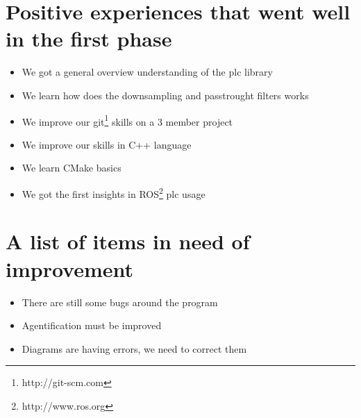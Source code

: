 \documentclass[paper=a4, fontsize=12pt]{scrartcl} %
\numberwithin{equation}{section} %
\numberwithin{figure}{section} %
\numberwithin{table}{section} %
\begin{document}


\section{Positive experiences that went well in the first phase}

\begin{itemize}
  \item We got  a general overview understanding of the plc library
  \item We learn how does the downsampling and passtrought filters works
  \item We improve our git\footnote{http://git-scm.com} skills on a 3 member project
  \item We improve our skills in C++ language
  \item We learn CMake basics
  \item We got the first insights in ROS\footnote{http://www.ros.org} plc usage
\end{itemize}



\section{A list of items in need of improvement}

\begin{itemize}
  \item There are still some bugs around the program
  \item Agentification must be improved
  \item Diagrams are having errors, we need to correct them
\end{itemize}


\end{document}
